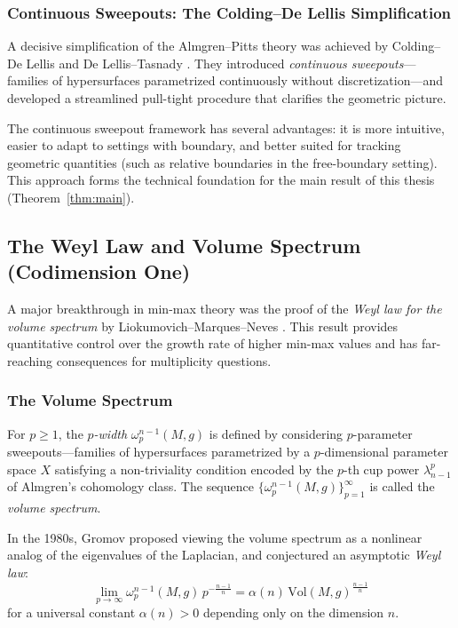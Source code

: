 \subsubsection{Continuous Sweepouts: The Colding--De Lellis Simplification}

A decisive simplification of the Almgren--Pitts theory was achieved by Colding--De Lellis \cite{CL03}
and De Lellis--Tasnady \cite{DLT13}. They introduced \emph{continuous sweepouts}---families of
hypersurfaces parametrized continuously without discretization---and developed a streamlined
pull-tight procedure that clarifies the geometric picture.

The continuous sweepout framework has several advantages: it is more intuitive, easier to adapt to
settings with boundary, and better suited for tracking geometric quantities (such as relative
boundaries in the free-boundary setting). This approach forms the technical foundation for the main
result of this thesis (Theorem~\ref{thm:main}).

\subsection{The Weyl Law and Volume Spectrum (Codimension One)}

A major breakthrough in min-max theory was the proof of the \emph{Weyl law for the volume spectrum}
by Liokumovich--Marques--Neves \cite{LMN}. This result provides quantitative control over the growth
rate of higher min-max values and has far-reaching consequences for multiplicity questions.

\subsubsection{The Volume Spectrum}

For $p \geq 1$, the \emph{$p$-width} $\omega_p^{n-1}(M,g)$ is defined by considering
$p$-parameter sweepouts---families of hypersurfaces parametrized by a $p$-dimensional parameter
space $X$ satisfying a non-triviality condition encoded by the $p$-th cup power $\lambda_{n-1}^p$
of Almgren's cohomology class. The sequence $\{\omega_p^{n-1}(M,g)\}_{p=1}^\infty$ is called the
\emph{volume spectrum}.

In the 1980s, Gromov \cite{Gro86,Gro02,Gro09} proposed viewing the volume spectrum as a nonlinear
analog of the eigenvalues of the Laplacian, and conjectured an asymptotic \emph{Weyl law}:
\[
    \lim_{p \to \infty} \omega_p^{n-1}(M,g) \, p^{-\frac{n-1}{n}} = \alpha(n) \, \mathrm{Vol}(M,g)^{\frac{n-1}{n}}
\]
for a universal constant $\alpha(n) > 0$ depending only on the dimension $n$.

